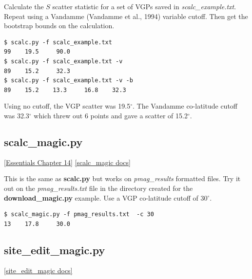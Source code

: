 \documentclass[11pt]{book}
\begin{document}
{Calculate the $S$ scatter statistic for a set of VGPs saved in {\it scalc\_example.txt}.  Repeat using a Vandamme (Vandamme et al., 1994) \nocite{vandamme94} variable cutoff.  Then get the bootstrap bounds on the calculation.

\begin{verbatim}
$ scalc.py -f scalc_example.txt
99    19.5     90.0
$ scalc.py -f scalc_example.txt -v
89    15.2     32.3
$ scalc.py -f scalc_example.txt -v -b
89    15.2    13.3     16.8    32.3
\end{verbatim}

Using no cutoff, the VGP scatter was 19.5$^{\circ}$.  The Vandamme co-latitude cutoff was 32.3$^{\circ}$ which threw out 6 points and gave a scatter of 15.2$^{\circ}$.


\subsection{scalc\_magic.py}
\href{http://earthref.org/MAGIC/books/Tauxe/Essentials/WebBook3ch14.html#ch14}{[Essentials Chapter 14]}
\href{https://github.com/PmagPy/PmagPy/blob/master/programs/scalc_magic.py}{[scalc\_magic docs]}

This is the same as {\bf scalc.py} but works on {\it pmag\_results} formatted files.   Try it out on the {\it pmag\_results.txt} file in the directory created for the {\bf download\_magic.py} example. Use a VGP co-latitude cutoff of 30$^{\circ}$.

\begin{verbatim}
$ scalc_magic.py -f pmag_results.txt  -c 30
13    17.8     30.0

\end{verbatim}


\subsection{site\_edit\_magic.py}
\href{https://github.com/PmagPy/PmagPy/blob/master/programs/site_edit_magic.py}{[site\_edit\_magic docs]}

}
\end{document}
